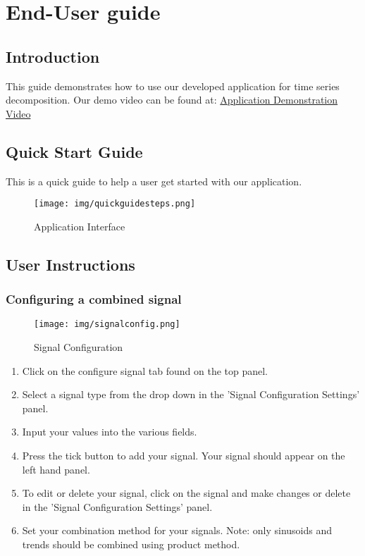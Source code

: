 \section{End-User guide}
\subsection{Introduction}
This guide demonstrates how to use our developed application for time series decomposition.
Our demo video can be found at: 
\href{https://www.overleaf.com/learn}{Application Demonstration Video}

\subsection{Quick Start Guide}
This is a quick guide to help a user get started with our application.
\begin{figure}
\centering
\texttt{[image: img/quickguidesteps.png]}
\caption{\label{fig:Application Interface}Application Interface}
\end{figure}


\subsection{User Instructions}
\subsubsection{Configuring a combined signal}
\begin{figure}
\centering
\texttt{[image: img/signalconfig.png]}
\caption{\label{fig:Signal Configuration}Signal Configuration}
\end{figure}

\begin{enumerate}
\item Click on the configure signal tab found on the top panel.
\item Select a signal type from the drop down in the 'Signal Configuration Settings' panel.
\item Input your values into the various fields.
\item Press the tick button to add your signal. Your signal should appear on the left hand panel.
\item To edit or delete your signal, click on the signal and make changes or delete in the 'Signal Configuration Settings' panel.
\item Set your combination method for your signals. Note: only sinusoids and trends should be combined using product method.
\end{enumerate}

